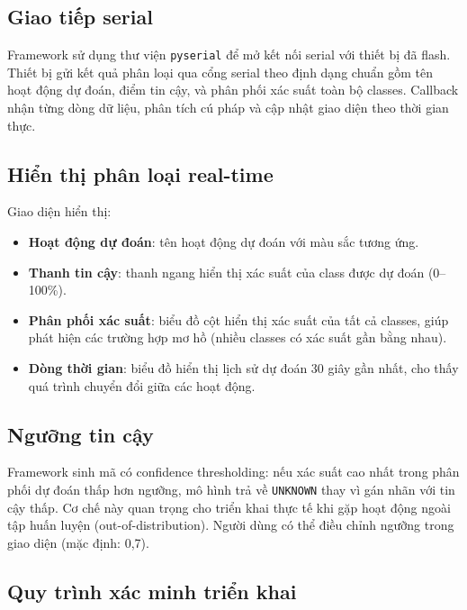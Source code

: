 \subsection{Giao tiếp serial}
\label{subsec:serial_communication}

Framework sử dụng thư viện \texttt{pyserial} để mở kết nối serial với thiết bị đã flash. Thiết bị gửi kết quả phân loại qua cổng serial theo định dạng chuẩn gồm tên hoạt động dự đoán, điểm tin cậy, và phân phối xác suất toàn bộ classes. Callback nhận từng dòng dữ liệu, phân tích cú pháp và cập nhật giao diện theo thời gian thực.

\subsection{Hiển thị phân loại real-time}
\label{subsec:realtime_classification_display}

Giao diện hiển thị:
\begin{itemize}
    \item \textbf{Hoạt động dự đoán}: tên hoạt động dự đoán với màu sắc tương ứng.
    \item \textbf{Thanh tin cậy}: thanh ngang hiển thị xác suất của class được dự đoán (0--100\%).
    \item \textbf{Phân phối xác suất}: biểu đồ cột hiển thị xác suất của tất cả classes, giúp phát hiện các trường hợp mơ hồ (nhiều classes có xác suất gần bằng nhau).
    \item \textbf{Dòng thời gian}: biểu đồ hiển thị lịch sử dự đoán 30 giây gần nhất, cho thấy quá trình chuyển đổi giữa các hoạt động.
\end{itemize}

\subsection{Ngưỡng tin cậy}
\label{subsec:confidence_threshold}

Framework sinh mã có confidence thresholding: nếu xác suất cao nhất trong phân phối dự đoán thấp hơn ngưỡng, mô hình trả về \texttt{UNKNOWN} thay vì gán nhãn với tin cậy thấp. Cơ chế này quan trọng cho triển khai thực tế khi gặp hoạt động ngoài tập huấn luyện (out-of-distribution). Người dùng có thể điều chỉnh ngưỡng trong giao diện (mặc định: 0,7).

\subsection{Quy trình xác minh triển khai}
\label{subsec:deployment_verification_workflow}

